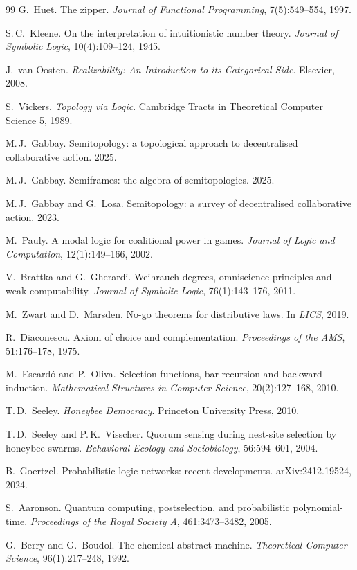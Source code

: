 \documentclass[11pt]{article}
\theoremstyle{definition}
\theoremstyle{plain}
\begin{document}
{\begin{thebibliography}{99}
 G.\ Huet. The zipper. \emph{Journal of Functional Programming},
7(5):549--554, 1997.

 S.\,C.\ Kleene. On the interpretation of intuitionistic
number theory. \emph{Journal of Symbolic Logic}, 10(4):109--124, 1945.

 J.\ van Oosten. \emph{Realizability: An Introduction to
its Categorical Side}. Elsevier, 2008.

 S.\ Vickers. \emph{Topology via Logic}. Cambridge Tracts in
Theoretical Computer Science 5, 1989.

 M.\,J.\ Gabbay. Semitopology: a topological approach to
decentralised collaborative action. 2025.

 M.\,J.\ Gabbay. Semiframes: the algebra of
semitopologies. 2025.

 M.\,J.\ Gabbay and G.\ Losa. Semitopology: a survey of
decentralised collaborative action. 2023.

 M.\ Pauly. A modal logic for coalitional power in games.
\emph{Journal of Logic and Computation}, 12(1):149--166, 2002.

 V.\ Brattka and G.\ Gherardi. Weihrauch degrees,
omniscience principles and weak computability. \emph{Journal of Symbolic Logic},
76(1):143--176, 2011.

 M.\ Zwart and D.\ Marsden. No-go theorems for
distributive laws. In \emph{LICS}, 2019.

 R.\ Diaconescu. Axiom of choice and complementation.
\emph{Proceedings of the AMS}, 51:176--178, 1975.

 M.\ Escard\'o and P.\ Oliva. Selection functions,
bar recursion and backward induction. \emph{Mathematical Structures in Computer
Science}, 20(2):127--168, 2010.

 T.\,D.\ Seeley. \emph{Honeybee Democracy}. Princeton
University Press, 2010.

 T.\,D.\ Seeley and P.\,K.\ Visscher. Quorum sensing
during nest-site selection by honeybee swarms. \emph{Behavioral Ecology and
Sociobiology}, 56:594--601, 2004.

 B.\ Goertzel. Probabilistic logic networks: recent
developments. arXiv:2412.19524, 2024.

 S.\ Aaronson. Quantum computing, postselection, and
probabilistic polynomial-time. \emph{Proceedings of the Royal Society A},
461:3473--3482, 2005.

 G.\ Berry and G.\ Boudol. The chemical abstract machine.
\emph{Theoretical Computer Science}, 96(1):217--248, 1992.

\end{thebibliography}
}
\end{document}
